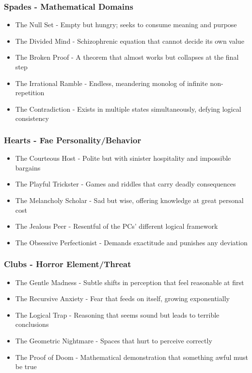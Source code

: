 \documentclass[11pt]{article}
\begin{document}
\subsubsection{Spades - Mathematical Domains}

\begin{itemize}
\item The Null Set - Empty but hungry; seeks to consume meaning and purpose
\item The Divided Mind - Schizophrenic equation that cannot decide its own value
\item The Broken Proof - A theorem that almost works but collapses at the final step
\item The Irrational Ramble - Endless, meandering monolog of infinite non-repetition
\item The Contradiction - Exists in multiple states simultaneously, defying logical consistency
\end{itemize}

\subsubsection{Hearts - Fae Personality/Behavior}

\begin{itemize}
\item The Courteous Host - Polite but with sinister hospitality and impossible bargains
\item The Playful Trickster - Games and riddles that carry deadly consequences
\item The Melancholy Scholar - Sad but wise, offering knowledge at great personal cost
\item The Jealous Peer - Resentful of the PCs' different logical framework
\item The Obsessive Perfectionist - Demands exactitude and punishes any deviation
\end{itemize}

\subsubsection{Clubs - Horror Element/Threat}

\begin{itemize}
\item The Gentle Madness - Subtle shifts in perception that feel reasonable at first
\item The Recursive Anxiety - Fear that feeds on itself, growing exponentially
\item The Logical Trap - Reasoning that seems sound but leads to terrible conclusions
\item The Geometric Nightmare - Spaces that hurt to perceive correctly
\item The Proof of Doom - Mathematical demonstration that something awful must be true
\end{itemize}
\end{document}
